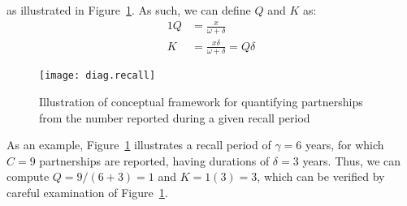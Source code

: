 as illustrated in Figure~\ref{fig:diag.recall}.
As such, we can define $Q$ and $K$ as:
\begin{alignat}{1}
  Q &= \frac{x}{\omega+\delta} \label{eq:C2Q.app}\\
  K &= \frac{x\delta}{\omega+\delta} = Q\delta \label{eq:C2K.app}
\end{alignat}
\begin{figure}
  \centering
  \texttt{[image: diag.recall]}
  \caption{Illustration of conceptual framework for quantifying partnerships
    from the number reported during a given recall period}
  \label{fig:diag.recall}
\end{figure}
\par
As an example, Figure~\ref{fig:diag.recall} illustrates
a recall period of $\gamma = 6$ years,
for which $C = 9$ partnerships are reported,
having durations of $\delta = 3$ years.
Thus, we can compute $Q = 9/(6+3) = 1$ and $K = 1(3) = 3$,
which can be verified by careful examination of Figure~\ref{fig:diag.recall}.

